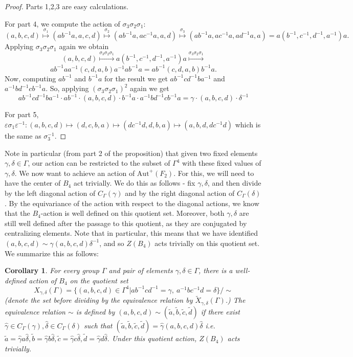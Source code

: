 \documentclass[letterpaper]{amsart}
\newtheorem{corollary}[theorem]{Corollary}
\begin{document}
\begin{proof}
    Parts 1,2,3 are easy calculations.

    For part 4, we compute the action of $\sigma_3\sigma_2\sigma_1$:
    $$(a, b, c, d) \overset{\sigma_1}{\mapsto} (ab^{-1}a, a, c, d) \overset{\sigma_2}{\mapsto} (ab^{-1}a, ac^{-1}a, a, d) \overset{\sigma_3}{\mapsto} (ab^{-1}a, ac^{-1}a, ad^{-1}a, a) = a (b^{-1}, c^{-1}, d^{-1}, a^{-1}) a.$$
    Applying $\sigma_3\sigma_2\sigma_1$ again we obtain
    $$(a,b,c,d)\overset{\sigma_3\sigma_2\sigma_1}{\mapsto}a (b^{-1}, c^{-1}, d^{-1}, a^{-1}) a\overset{\sigma_3\sigma_2\sigma_1}{\mapsto}$$
    $$ab^{-1}a a^{-1} (c, d, a, b) a^{-1} ab^{-1}a = ab^{-1} (c, d, a, b) b^{-1}a.$$
    Now, computing $ab^{-1}$ and $b^{-1}a$ for the result we get $ab^{-1}cd^{-1}ba^{-1}$ and $a^{-1}bd^{-1}cb^{-1}a$. So, applying $(\sigma_3\sigma_2\sigma_1)^2$ again we get
    $$ab^{-1}cd^{-1}ba^{-1} \cdot ab^{-1} \cdot (a, b, c, d) \cdot b^{-1}a \cdot a^{-1}bd^{-1}cb^{-1}a = \gamma \cdot (a,b,c,d) \cdot \delta^{-1}$$

    For part 5, $\varepsilon \sigma_1 \varepsilon^{-1} :(a, b, c, d) \mapsto (d, c, b, a) \mapsto (dc^{-1}d, d, b, a) \mapsto (a, b, d, dc^{-1}d)$ which is the same as $\sigma_3^{-1}$.
\end{proof}
Note in particular (from part 2 of the proposition) that given two fixed elements $\gamma,\delta\in\Gamma$, our action can be restricted to the subset of $\Gamma^4$ with these fixed values of $\gamma,\delta$.
We now want to achieve an action of $\mathrm{Aut}^{+}(F_2)$. For this, we will need to have the center of $B_4$ act trivially. We do this as follows - fix $\gamma,\delta$, and then divide by the left diagonal action of $C_\Gamma(\gamma)$ and by the right diagonal action of $C_\Gamma(\delta)$. By the equivariance of the action with respect to the diagonal actions, we know that the $B_4$-action is well defined on this quotient set. Moreover, both $\gamma,\delta$ are still well defined after the passage to this quotient, as they are conjugated by centralizing elements.
Note that in particular, this means that we have identified $(a,b,c,d) \sim \gamma (a, b, c, d) \delta^{-1}$, and so $Z(B_4)$ acts trivially on this quotient set. We summarize this as follows:
\begin{corollary}
For every group $\Gamma$ and pair of elements $\gamma,\delta\in\Gamma$, there is a well-defined action of $B_4$ on the quotient set $$X_{\gamma, \delta}(\Gamma) = \{(a,b,c,d) \in \Gamma^4 | ab^{-1}cd^{-1} = \gamma,\ a^{-1}bc^{-1}d = \delta\}/\sim$$(denote the set before dividing by the equivalence relation by $\tilde{X}_{\gamma, \delta}(\Gamma)$.) The equivalence relation $\sim$ is defined by $(a,b,c,d)\sim (\tilde{a}, \tilde{b}, \tilde{c}, \tilde{d})$ if there exist $\hat{\gamma}\in C_\Gamma(\gamma), \hat{\delta} \in C_\Gamma(\delta)$ such that $(\tilde{a},\tilde{b},\tilde{c},\tilde{d})=\hat{\gamma}(a,b,c,d)\hat{\delta}$ i.e. $\tilde{a} = \hat{\gamma} a \hat{\delta}, \tilde{b} = \hat{\gamma} b \hat{\delta}, \tilde{c} = \hat{\gamma} c \hat{\delta}, \tilde{d} = \hat{\gamma} d \hat{\delta}.$
Under this quotient action, $Z(B_4)$ acts trivially.
\end{corollary}
\end{document}
